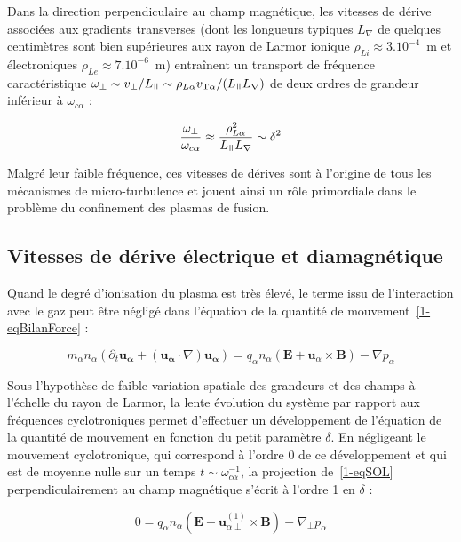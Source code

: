 \begin{refsection}
Dans la direction perpendiculaire au champ
magnétique, les vitesses de dérive associées aux gradients transverses (dont les longueurs
typiques $L_\nabla$ de quelques centimètres sont bien supérieures aux rayon de
Larmor ionique $\rho_{Li}\approx3.10^{-4}$~m et électroniques
$\rho_{Le}\approx7.10^{-6}$~m) entraînent un transport de fréquence
caractéristique $\omega_\perp\sim v_\perp/L_\para\sim\rho_{L\alpha}
v_{\text{T}\alpha}/(L_\para L_\nabla)$ de deux ordres de grandeur inférieur à
$\omega_{c\alpha}$ :

\begin{equation}
\frac{\omega_\perp}{\omega_{c\alpha}}\approx\frac{\rho_{L\alpha}^2}{L_\para
L_\nabla}\sim\delta^2
\end{equation}

Malgré leur faible fréquence, ces vitesses de dérives sont à l'origine de tous
les mécanismes de micro-turbulence et jouent ainsi un rôle primordiale dans le
problème du confinement des plasmas de fusion.

\subsection{Vitesses de dérive électrique et diamagnétique}

Quand le degré d'ionisation du plasma est très élevé, le terme issu de
l'interaction avec le gaz peut être négligé dans l'équation de la quantité de
mouvement~\eqref{1-eqBilanForce} :

\begin{equation}
\label{1-eqSOL}
 m_\alpha n_\alpha\left(\partial_t \mathbf{u_\alpha} +
(\mathbf{u_\alpha}\cdot\nabla)\mathbf{u_\alpha}\right)
={q_\alpha n_\alpha}\left(\mathbf E+\mathbf
u_\alpha\times \mathbf B\right)
-{\nabla p_\alpha}
\end{equation}

 Sous l'hypothèse de faible variation spatiale des grandeurs et des champs à
 l'échelle du rayon de Larmor, la lente évolution du système par rapport aux
 fréquences cyclotroniques permet d'effectuer un développement de l'équation de
 la quantité de mouvement en fonction du petit paramètre $\delta$. En négligeant
 le mouvement cyclotronique, qui correspond à l'ordre 0 de ce développement et qui
 est de moyenne nulle sur un temps $t\sim\omega_{c\alpha}^{-1}$, la projection
 de~\eqref{1-eqSOL} perpendiculairement au champ magnétique s'écrit à l'ordre 1
 en $\delta$ :
 
 \begin{equation}
\label{1-eqSOLperp}
0
={q_\alpha n_\alpha}\left(\mathbf E+\mathbf
u_{\alpha\perp}^{(1)}\times \mathbf B\right)
-{\nabla_\perp p_\alpha}
\end{equation}


\end{refsection}
